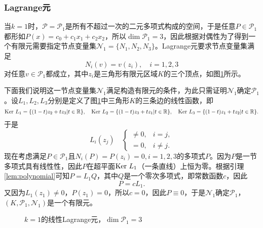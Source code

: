 \documentclass[a4paper,10pt]{ctexart}
\begin{document}
\subsubsection{Lagrange元}
当$ k=1 $时，$ \mathcal{P} = \mathcal{P}_1 $是所有不超过一次的二元多项式构成的空间，于是任意$ P\in \mathcal{P}_1 $都形如$ P(x) = c_0 + c_1 x_1 + c_2 x_2 $，所以$ \dim \mathcal{P}_1 = 3 $，因此根据对偶性为了得到一个有限元需要指定节点变量集$ \mathcal{N}_1 = \{N_1,N_2,N_3\} $。Lagrange元要求节点变量集满足
\begin{equation}
    N_i(v) = v(z_i),\quad i = 1,2,3
\end{equation}
对任意$ v\in \mathcal{P}_1 $都成立，其中$ z_i $是三角形有限元区域$ K $的三个顶点，如图\ref{fig:Lagrange_1}所示。

下面我们说明这一节点变量集$ \mathcal{N}_1 $满足构造有限元的条件，为此只需证明$ \mathcal{N}_1 $确定$ \mathcal{P}_1 $。设$ L_1,L_2,L_3 $分别是定义了图\ref{fig:Lagrange_1}中三角形$ K $的三条边的线性函数，即
\[
    {\rm Ker}\ L_1 = \{(1-t)z_2 + tz_3 |t\in \mathbb{R} \}, \quad {\rm Ker}\ L_2 = \{(1-t)z_3 + tz_1 |t\in \mathbb{R} \}, \quad {\rm Ker}\ L_3 = \{(1-t)z_1 + tz_2 |t\in \mathbb{R} \}.
\]
于是
\[
    L_i(z_j) \quad 
    \begin{cases}
        \ne 0, & i = j,\\
        =0, & i \neq j.
    \end{cases}
\]
现在考虑满足$ P\in \mathcal{P}_1 $且$ N_i(P) = P(z_i) = 0,i=1,2,3 $的多项式$ P $。因为$ P $是一节多项式具有线性性，因此$ P $在超平面$ {\rm Ker}\ L_1 $（一条直线）上恒为零。根据引理\ref{lem:polynomial}可知$ P = L_1Q $，其中$ Q $是一个零次多项式，即常数函数$ c $，因此
\[
    P = cL_1.
\]
又因为$ L_1(z_1)\ne 0 $，$ P(z_1) = 0 $，所以$ c=0 $，因此$ P \equiv 0 $，于是$ \mathcal{N}_1 $确定$ \mathcal{P}_1 $，$ (K,\mathcal{P}_1,\mathcal{N}_1) $是一个有限元。

\begin{figure}[htpb]
    \centering
    \caption{$ k=1 $的线性Lagrange元，$ \dim \mathcal{P}_1 = 3 $}
    \label{fig:Lagrange_1}
\end{figure}
\end{document}
